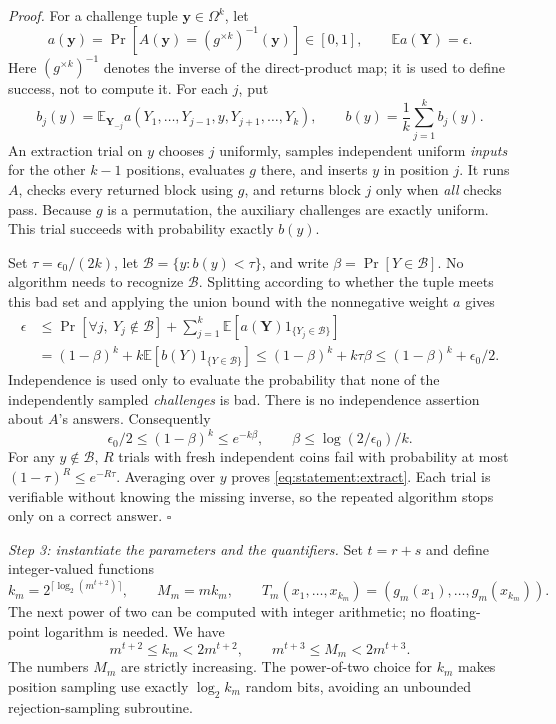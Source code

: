 \documentclass[11pt,a4paper]{article}
\newcommand{\E}{\mathbb{E}}
\numberwithin{equation}{section}
\begin{document}
\textit{Proof.}
For a challenge tuple $\mathbf y\in\Omega^k$, let
\[
 a(\mathbf y)=\Pr[A(\mathbf y)=(g^{\times k})^{-1}(\mathbf y)]\in[0,1],
 \qquad \E a(\mathbf Y)=\epsilon.
\]
Here $(g^{\times k})^{-1}$ denotes the inverse of the direct-product map;
it is used to define success, not to compute it. For each $j$, put
\[
 b_j(y)=\E_{\mathbf Y_{-j}}a(Y_1,\ldots,Y_{j-1},y,Y_{j+1},\ldots,Y_k),
 \qquad b(y)=\frac1k\sum_{j=1}^k b_j(y).
\]
An extraction trial on $y$ chooses $j$ uniformly, samples independent
uniform \emph{inputs} for the other $k-1$ positions, evaluates $g$ there,
and inserts $y$ in position $j$. It runs $A$, checks every returned block
using $g$, and returns block $j$ only when \emph{all} checks pass.
Because $g$ is a permutation, the auxiliary challenges are exactly
uniform. This trial succeeds with probability exactly $b(y)$.

Set $\tau=\epsilon_0/(2k)$, let
$\mathcal B=\{y:b(y)<\tau\}$, and write
$\beta=\Pr[Y\in\mathcal B]$. No algorithm needs to recognize
$\mathcal B$. Splitting according to whether the tuple meets this bad
set and applying the union bound with the nonnegative weight $a$ gives
\begin{align}
 \epsilon
 &\le \Pr[\forall j,\ Y_j\notin\mathcal B]
       +\sum_{j=1}^k \E[a(\mathbf Y)1_{\{Y_j\in\mathcal B\}}]
       \label{eq:statement:bad1}\\
 &= (1-\beta)^k+k\E[b(Y)1_{\{Y\in\mathcal B\}}]
 \le (1-\beta)^k+k\tau\beta
 \le (1-\beta)^k+\epsilon_0/2. \label{eq:statement:bad2}
\end{align}
Independence is used only to evaluate the probability
that none of the independently sampled \emph{challenges} is bad.
There is no independence assertion about $A$'s answers.
Consequently
\[
 \epsilon_0/2\le(1-\beta)^k\le e^{-k\beta},
 \qquad \beta\le\log(2/\epsilon_0)/k.
\]
For any $y\notin\mathcal B$, $R$ trials with fresh independent coins
fail with probability at most
$(1-\tau)^R\le e^{-R\tau}$. Averaging over $y$ proves
\eqref{eq:statement:extract}. Each trial is verifiable without knowing the
missing inverse, so the repeated algorithm stops only on a correct
answer. \hfill$\square$

\textit{Step 3: instantiate the parameters and the quantifiers.}
Set $t=r+s$ and define integer-valued functions
\begin{equation}\label{eq:statement:lengths}
 k_m=2^{\lceil\log_2(m^{t+2})\rceil},\qquad
 M_m=m k_m,\qquad
 T_m(x_1,\ldots,x_{k_m})=(g_m(x_1),\ldots,g_m(x_{k_m})).
\end{equation}
The next power of two can be computed with integer arithmetic; no
floating-point logarithm is needed. We have
\[
 m^{t+2}\le k_m<2m^{t+2},\qquad
 m^{t+3}\le M_m<2m^{t+3}.
\]
The numbers $M_m$ are strictly increasing. The power-of-two choice for
$k_m$ makes position sampling use exactly $\log_2 k_m$ random bits,
avoiding an unbounded rejection-sampling subroutine.
\end{document}
